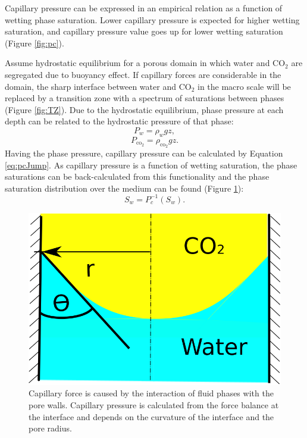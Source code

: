 Capillary pressure can be expressed in an empirical relation as a function of
wetting phase saturation. Lower capillary pressure is expected for higher
wetting saturation, and capillary pressure value goes up for lower wetting
saturation (Figure \ref{fig:pc}). 

Assume hydrostatic equilibrium for a porous domain in which water and
$\mbox{CO}_2$ are segregated due to buoyancy effect.  If capillary forces
are considerable in the domain, the sharp interface between water and
$\mbox{CO}_2$ in the macro scale will be replaced by a transition zone with a
spectrum of saturations between phases (Figure \ref{fig:TZ}). Due to the
hydrostatic equilibrium, phase pressure at each depth can be related to the
hydrostatic pressure of that phase:
\begin{equation}
 P_w=\rho_wgz
 \label{eq:rghw},
\end{equation}
\begin{equation}
 P_{\mbox{co}_2}=\rho_{\mbox{co}_2}gz
 \label{eq:rghc}.
\end{equation} Having the phase pressure, capillary pressure can be calculated
by
Equation  \ref{eq:pcJump}. As capillary pressure is a function of wetting
saturation, the phase saturations can be back-calculated from this functionality
and the phase saturation distribution over the medium can be found (Figure
\ref{fig:PC}):
\begin{equation}
 S_w = P_c^{-1}(S_w).
 \label{eq:pc-1}
\end{equation}



\begin{figure}
 \centering{}
 \includegraphics[width=0.35\linewidth]{./figurer/pipe}
 \caption{Capillary force is caused by the interaction of fluid phases with the pore walls. Capillary pressure is calculated from the force balance at the interface and depends on the curvature of the interface and the pore radius.}
 \label{fig:PC}
\end{figure}

